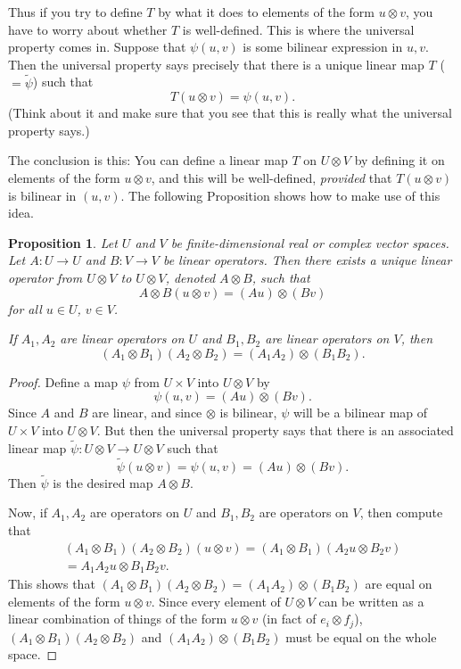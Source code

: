 \documentclass{amsbook}
\theoremstyle{plain}
\newtheorem{proposition}[theorem]{Proposition}
\numberwithin{equation}{chapter}
\numberwithin{theorem}{chapter}
\begin{document}
Thus if you try to define $T$ by what it does to elements of the form
$u\otimes v$, you have to worry about whether $T$ is well-defined. This is
where the universal property comes in. Suppose that $\psi(u,v)$ is some
bilinear expression in $u,v$. Then the universal property says precisely that
there is a unique linear map $T$ ($=\widetilde{\psi}$) such that
\[
T(u\otimes v)=\psi(u,v)\text{.}%
\]
(Think about it and make sure that you see that this is really what the
universal property says.)

The conclusion is this: You can define a linear map $T$ on $U\otimes V$ by
defining it on elements of the form $u\otimes v$, and this will be
well-defined, \textit{provided} that $T(u\otimes v)$ is bilinear in $(u,v)$.
The following Proposition shows how to make use of this idea.

\begin{proposition}
Let $U$ and $V$ be finite-dimensional real or complex vector spaces. Let
$A:U\rightarrow U$ and $B:V\rightarrow V$ be linear operators. Then there
exists a unique linear operator from $U\otimes V$ to $U\otimes V$, denoted
$A\otimes B$, such that
\[
A\otimes B(u\otimes v)=\left(  Au\right)  \otimes\left(  Bv\right)
\]
for all $u\in U$, $v\in V$.

If $A_{1},A_{2}$ are linear operators on $U$ and $B_{1},B_{2}$ are linear
operators on $V$, then
\[
\left(  A_{1}\otimes B_{1}\right)  \left(  A_{2}\otimes B_{2}\right)  =\left(
A_{1}A_{2}\right)  \otimes\left(  B_{1}B_{2}\right)  \text{.}%
\]
\end{proposition}

\begin{proof}
Define a map $\psi$ from $U\times V$ into $U\otimes V$ by
\[
\psi(u,v)=\left(  Au\right)  \otimes\left(  Bv\right)  \text{.}%
\]
Since $A$ and $B$ are linear, and since $\otimes$ is bilinear, $\psi$ will be
a bilinear map of $U\times V$ into $U\otimes V$. But then the universal
property says that there is an associated linear map $\widetilde{\psi
}:U\otimes V\rightarrow U\otimes V$ such that
\[
\widetilde{\psi}(u\otimes v)=\psi(u,v)=\left(  Au\right)  \otimes\left(
Bv\right)  \text{.}%
\]
Then $\widetilde{\psi}$ is the desired map $A\otimes B$.

Now, if $A_{1},A_{2}$ are operators on $U$ and $B_{1},B_{2}$ are operators on
$V$, then compute that
\begin{align*}
\left(  A_{1}\otimes B_{1}\right)  \left(  A_{2}\otimes B_{2}\right)
(u\otimes v)=\left(  A_{1}\otimes B_{1}\right)  \left(  A_{2}u\otimes
B_{2}v\right)  \\
=A_{1}A_{2}u\otimes B_{1}B_{2}v\text{.}%
\end{align*}
This shows that $\left(  A_{1}\otimes B_{1}\right)  \left(  A_{2}\otimes
B_{2}\right)  =\left(  A_{1}A_{2}\right)  \otimes\left(  B_{1}B_{2}\right)  $
are equal on elements of the form $u\otimes v$. Since every element of
$U\otimes V$ can be written as a linear combination of things of the form
$u\otimes v$ (in fact of $e_{i}\otimes f_{j}$), $\left(  A_{1}\otimes
B_{1}\right)  \left(  A_{2}\otimes B_{2}\right)  $ and $\left(  A_{1}%
A_{2}\right)  \otimes\left(  B_{1}B_{2}\right)  $ must be equal on the whole space.
\end{proof}
\end{document}
